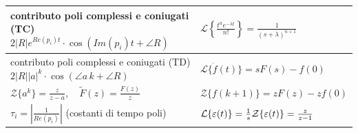\documentclass[10pt,a4paper]{article}
\begin{document}
\begin{center}
{{\begin{minipage}[t]{0.48\textwidth}
\renewcommand{\arraystretch}{1.6}
\begin{tabularx}{\linewidth}{|>{\centering\arraybackslash}X|>{\centering\arraybackslash}X|}
\hline
contributo poli complessi e coniugati (TC) \newline $2|R|e^{Re(p_i)t} \cdot \cos(Im(p_i)t + \angle R)$ & 
$\mathcal{L}\left\{ \frac{t^n e^{-\lambda t}}{n!} \right\} = \frac{1}{(s + \lambda)^{n+1}}$ \\
\hline
contributo poli complessi e coniugati (TD) \newline $2|R||a|^k \cdot \cos(\angle a\, k + \angle R)$ & 
$\mathcal{L}\{\dot{f}(t)\} = sF(s) - f(0)$ \\
\hline
$\mathcal{Z}\{a^k\} = \frac{z}{z-a}, \quad \tilde{F}(z) = \frac{F(z)}{z}$ & 
$\mathcal{Z}\{f(k+1)\} = zF(z) - zf(0)$ \\
\hline
$\tau_i = \left| \frac{1}{Re(p_i)} \right|$ (costanti di tempo poli) & 
$\mathcal{L}\{\varepsilon(t)\} = \frac{1}{s} \newline \mathcal{Z}\{\varepsilon(t)\} = \frac{z}{z-1}$ \\
\hline
\end{tabularx}
\end{minipage}
}}
\end{center}

\vspace{-1.5mm}
\end{document}
